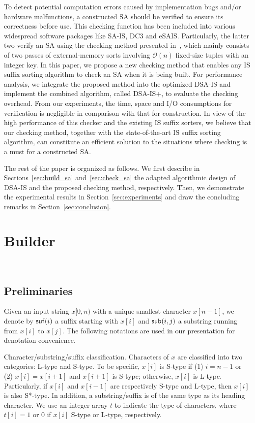 \documentclass[10pt,journal,compsoc]{IEEEtran}
\begin{document}
To detect potential computation errors caused by implementation bugs and/or hardware malfunctions, a constructed SA should be verified to ensure its correctness before use. This checking function has been included into various widespread software packages like SA-IS, DC3 and eSAIS. Particularly, the latter two verify an SA using the checking method presented in~\cite{Dementiev2008a}, which mainly consists of two passes of external-memory sorts involving $\mathcal{O}(n)$ fixed-size tuples with an integer key. In this paper, we propose a new checking method that enables any IS suffix sorting algorithm to check an SA when it is being built. 
For performance analysis, we integrate the proposed method into the optimized DSA-IS and implement the combined algorithm, called DSA-IS+, to evaluate the checking overhead. From our experiments, the time, space and I/O consumptions for verification is negligible in comparison with that for construction. In view of the high performance of this checker and the existing IS suffix sorters, we believe that our checking method, together with the state-of-the-art IS suffix sorting algorithm, can constitute an efficient solution to the situations where checking is a must for a constructed SA.

The rest of the paper is organized as follows. We first describe in Sections~\ref{sec:build_sa} and~\ref{sec:check_sa} the adapted algorithmic design of DSA-IS and the proposed checking method, respectively. Then, we demonstrate the experimental results in Section~\ref{sec:experiments} and draw the concluding remarks in Section~\ref{sec:conclusion}.


\section{Builder}~\label{sec:build_sa}

\subsection{Preliminaries}

Given an input string $x[0, n)$ with a unique smallest character $x[n - 1]$, we denote by ${\sf suf}(i)$ a suffix starting with $x[i]$ and ${\sf sub}(i,j)$ a substring running from $x[i]$ to $x[j]$. The following notations are used in our presentation for denotation convenience.

Character/substring/suffix classification. Characters of $x$ are classified into two categories: L-type and S-type. To be specific, $x[i]$ is S-type if (1) $i = n - 1$ or (2) $x[i] = x[i + 1]$ and $x[i + 1]$ is S-type; otherwise, $x[i]$ is L-type. Particularly, if $x[i]$ and $x[i - 1]$ are respectively S-type and L-type, then $x[i]$ is also S*-type. In addition, a substring/suffix is of the same type as its heading character. We use an integer array $t$ to indicate the type of characters, where $t[i] = 1$ or $0$ if $x[i] $ S-type or L-type, respectively.
\end{document}
